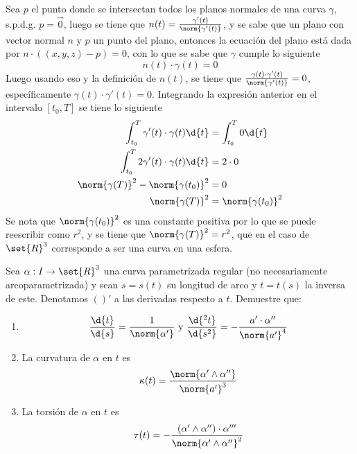 \documentclass{homework}
\begin{document}
\begin{sol}
    Sea \(p\) el punto donde se intersectan todos los planos normales de una curva \(\gamma\), s.p.d.g. \(p=\vec{0}\), luego se tiene que \(n(t)=\frac{\gamma'(t)}{\norm{\gamma'(t)}}\), y se sabe que un plano con vector normal \(n\) y \(p\) un punto del plano, entonces la ecuación del plano está dada por \(n\cdot((x,y,z)-p)=0\), con lo que se sabe que \(\gamma\) cumple lo siguiente
    \begin{equation*}
        n(t)\cdot\gamma(t)=0
    \end{equation*}
    Luego usando eso y la definición de \(n(t)\), se tiene que \(\frac{\gamma(t)\cdot\gamma'(t)}{\norm{\gamma'(t)}}=0\), específicamente \(\gamma(t)\cdot\gamma'(t)=0\). Integrando la expresión anterior en el intervalo \([t_0,T]\) se tiene lo siguiente
    \begin{align*}
        \int_{t_0}^T\gamma'(t)\cdot\gamma(t)\d{t}  & =\int_{t_0}^T0\d{t}   \\
        \int_{t_0}^T2\gamma'(t)\cdot\gamma(t)\d{t} & =2\cdot 0             \\
        \norm{\gamma(T)}^2-\norm{\gamma(t_0)}^2    & =0                    \\
        \norm{\gamma(T)}^2                         & =\norm{\gamma(t_0)}^2
    \end{align*}
    Se nota que \(\norm{\gamma(t_0)}^2\) es una constante positiva por lo que se puede reescribir como \(r^2\), y se tiene que \(\norm{\gamma(T)}^2=r^2\), que en el caso de \(\set{R}^3\) corresponde a ser una curva en una esfera.
\end{sol}


\begin{prob}
    Sea \(\alpha:I\rightarrow\set{R}^3\) una curva parametrizada regular (no necesariamente arcoparametrizada) y sean \(s=s(t)\) su longitud de arco y \(t=t(s)\) la inversa de este. Denotamos \(()'\) a las derivadas respecto a \(t\). Demuestre que:
    \begin{enumerate}
        \item \begin{equation*}
                  \frac{\d{t}}{\d{s}}=\frac1{\norm{\alpha'}}\text{ y }\frac{\d{^2t}}{\d{s^2}}=-\frac{a'\cdot\alpha''}{\norm{a'}^4}
              \end{equation*}
        \item La curvatura de \(\alpha\) en \(t\) es
              \begin{equation*}
                  \kappa(t)=\frac{\norm{\alpha'\wedge\alpha''}}{\norm{a'}^3}
              \end{equation*}
        \item La torsión de \(\alpha\) en \(t\) es
              \begin{equation*}
                  \tau(t)=-\frac{(\alpha'\wedge\alpha'')\cdot\alpha'''}{\norm{\alpha'\wedge\alpha''}^2}
              \end{equation*}
    \end{enumerate}
\end{prob}
\end{document}
